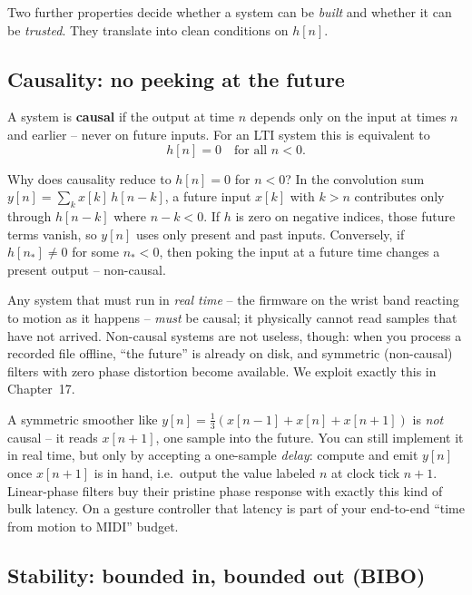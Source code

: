 Two further properties decide whether a system can be \emph{built} and whether
it can be \emph{trusted}. They translate into clean conditions on $h[n]$.

\subsection*{Causality: no peeking at the future}

\begin{definition}[Causality]
\label{ch12:def-causal}
A system is \textbf{causal} if the output at time $n$ depends only on the input
at times $n$ and earlier -- never on future inputs. For an LTI system this is
equivalent to
\[
  h[n] = 0 \quad\text{for all } n < 0.
\]
\end{definition}

\begin{whybox}
Why does causality reduce to $h[n]=0$ for $n<0$? In the convolution sum
$y[n] = \sum_k x[k]\,h[n-k]$, a future input $x[k]$ with $k>n$ contributes only
through $h[n-k]$ where $n-k<0$. If $h$ is zero on negative indices, those future
terms vanish, so $y[n]$ uses only present and past inputs. Conversely, if
$h[n_*]\ne0$ for some $n_*<0$, then poking the input at a future time changes a
present output -- non-causal.
\end{whybox}

Any system that must run in \emph{real time} -- the firmware on the wrist
band reacting to motion as it happens -- \emph{must} be causal; it physically
cannot read samples that have not arrived. Non-causal systems are not useless,
though: when you process a recorded file offline, ``the future'' is already on
disk, and symmetric (non-causal) filters with zero phase distortion become
available. We exploit exactly this in Chapter~17.

\begin{trapbox}
A symmetric smoother like $y[n]=\tfrac13(x[n-1]+x[n]+x[n+1])$ is \emph{not}
causal -- it reads $x[n+1]$, one sample into the future. You can still implement
it in real time, but only by accepting a one-sample \emph{delay}: compute and
emit $y[n]$ once $x[n+1]$ is in hand, i.e.\ output the value labeled $n$ at clock
tick $n{+}1$. Linear-phase filters buy their pristine phase response with exactly
this kind of bulk latency. On a gesture controller that latency is part of your
end-to-end ``time from motion to MIDI'' budget.
\end{trapbox}

\subsection*{Stability: bounded in, bounded out (BIBO)}

